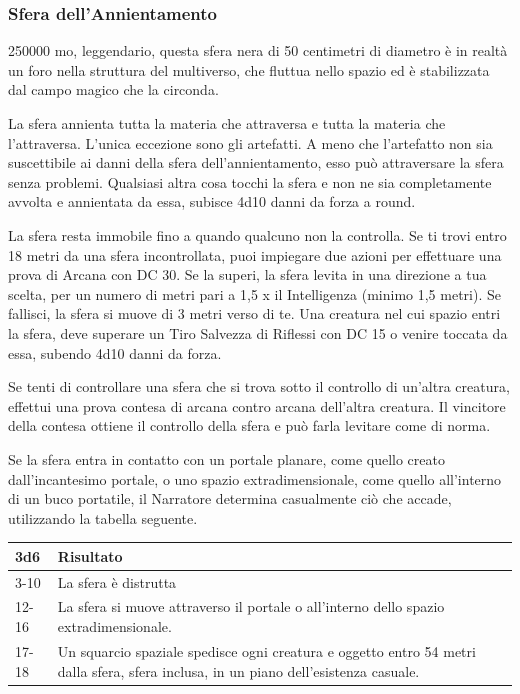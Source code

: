 \begin{multicols}{2}
\subsubsection*{Sfera dell'Annientamento}
250000 mo, leggendario, questa sfera nera di 50 centimetri di diametro è in realtà un foro nella struttura del multiverso, che fluttua nello spazio ed è stabilizzata dal campo magico che la circonda.

La sfera annienta tutta la materia che attraversa e tutta la materia che l'attraversa. L'unica eccezione sono gli artefatti. A meno che l'artefatto non sia suscettibile ai danni della sfera dell'annientamento, esso può attraversare la sfera senza problemi. Qualsiasi altra cosa tocchi la sfera e non ne sia completamente avvolta e annientata da essa, subisce 4d10 danni da forza a round.

La sfera resta immobile fino a quando qualcuno non la controlla. Se ti trovi entro 18 metri da una sfera incontrollata, puoi impiegare due azioni per effettuare una prova di Arcana con DC 30. Se la superi, la sfera levita in una direzione a tua scelta, per un numero di metri pari a 1,5 x il Intelligenza (minimo 1,5 metri). Se fallisci, la sfera si muove di 3 metri verso di te. Una creatura nel cui spazio entri la sfera, deve superare un Tiro Salvezza di Riflessi con DC 15 o venire toccata da essa, subendo 4d10 danni da forza.

Se tenti di controllare una sfera che si trova sotto il controllo di un'altra creatura, effettui una prova contesa di arcana contro arcana dell'altra creatura. Il vincitore della contesa ottiene il controllo della sfera e può farla levitare come di norma.

Se la sfera entra in contatto con un portale planare, come quello creato dall'incantesimo portale, o uno spazio extradimensionale, come quello all'interno di un buco portatile, il Narratore determina casualmente ciò che accade, utilizzando la tabella seguente.

\medskip

\begin{tabularx}{0.45\textwidth}{lX}
\textbf{3d6}& \textbf{Risultato}\\
\hline
3-10 &La sfera è distrutta\\
12-16& La sfera si muove attraverso il portale o all'interno dello spazio extradimensionale.\\
17-18 &Un squarcio spaziale spedisce ogni creatura e oggetto entro 54 metri dalla sfera, sfera inclusa, in un piano dell'esistenza casuale.\\
\end{tabularx}


\end{multicols}
